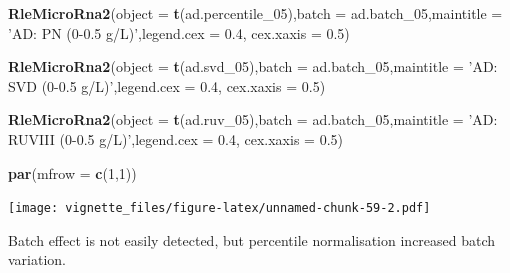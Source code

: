 \documentclass[]{book}
\newenvironment{Shaded}{\begin{snugshade}}{\end{snugshade}}
\newcommand{\KeywordTok}[1]{\textcolor[rgb]{0.13,0.29,0.53}{\textbf{#1}}}
\newcommand{\DataTypeTok}[1]{\textcolor[rgb]{0.13,0.29,0.53}{#1}}
\newcommand{\DecValTok}[1]{\textcolor[rgb]{0.00,0.00,0.81}{#1}}
\newcommand{\FloatTok}[1]{\textcolor[rgb]{0.00,0.00,0.81}{#1}}
\newcommand{\StringTok}[1]{\textcolor[rgb]{0.31,0.60,0.02}{#1}}
\newcommand{\NormalTok}[1]{#1}
\begin{document}
\begin{Shaded}
\begin{Highlighting}[]
\KeywordTok{RleMicroRna2}\NormalTok{(}\DataTypeTok{object =} \KeywordTok{t}\NormalTok{(ad.percentile_}\DecValTok{05}\NormalTok{),}\DataTypeTok{batch =}\NormalTok{ ad.batch_}\DecValTok{05}\NormalTok{,}\DataTypeTok{maintitle =} \StringTok{'AD: PN (0-0.5 g/L)'}\NormalTok{,}\DataTypeTok{legend.cex =} \FloatTok{0.4}\NormalTok{, }\DataTypeTok{cex.xaxis =} \FloatTok{0.5}\NormalTok{)}

\KeywordTok{RleMicroRna2}\NormalTok{(}\DataTypeTok{object =} \KeywordTok{t}\NormalTok{(ad.svd_}\DecValTok{05}\NormalTok{),}\DataTypeTok{batch =}\NormalTok{ ad.batch_}\DecValTok{05}\NormalTok{,}\DataTypeTok{maintitle =} \StringTok{'AD: SVD (0-0.5 g/L)'}\NormalTok{,}\DataTypeTok{legend.cex =} \FloatTok{0.4}\NormalTok{, }\DataTypeTok{cex.xaxis =} \FloatTok{0.5}\NormalTok{)}

\KeywordTok{RleMicroRna2}\NormalTok{(}\DataTypeTok{object =} \KeywordTok{t}\NormalTok{(ad.ruv_}\DecValTok{05}\NormalTok{),}\DataTypeTok{batch =}\NormalTok{ ad.batch_}\DecValTok{05}\NormalTok{,}\DataTypeTok{maintitle =} \StringTok{'AD: RUVIII (0-0.5 g/L)'}\NormalTok{,}\DataTypeTok{legend.cex =} \FloatTok{0.4}\NormalTok{, }\DataTypeTok{cex.xaxis =} \FloatTok{0.5}\NormalTok{)}

\KeywordTok{par}\NormalTok{(}\DataTypeTok{mfrow =} \KeywordTok{c}\NormalTok{(}\DecValTok{1}\NormalTok{,}\DecValTok{1}\NormalTok{))}
\end{Highlighting}
\end{Shaded}

\texttt{[image: vignette\_files/figure-latex/unnamed-chunk-59-2.pdf]}

Batch effect is not easily detected, but percentile normalisation
increased batch variation.
\end{document}
